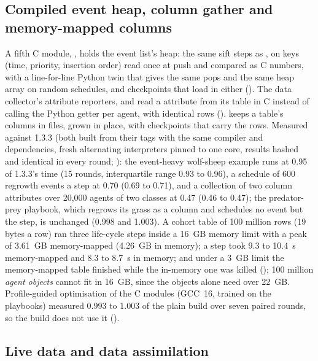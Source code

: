 \subsection{Compiled event heap, column gather and memory-mapped columns}
\label{app:perf2}

A fifth C module, , holds the event list's heap: the same sift steps as
, on keys (time, priority, insertion order) read once at push and compared as C
numbers, with a line-for-line Python twin that gives the same pops and the same heap array on
random schedules, and checkpoints that load in either ().
The data collector's attribute reporters,  and  read a
 attribute from its table in C instead of calling the Python getter per agent,
with identical rows ().  keeps a
table's columns in  files, grown in place, with checkpoints that carry the
rows. Measured against 1.3.3 (both built from their tags with the same compiler and
dependencies, fresh alternating interpreters pinned to one core, results hashed and identical
in every round; ): the event-heavy wolf-sheep example runs at 0.95
of 1.3.3's time (15 rounds, interquartile range 0.93 to 0.96), a schedule of 600 regrowth
events a step at 0.70 (0.69 to 0.71), and a collection of two column attributes over 20,000
agents of two classes at 0.47 (0.46 to 0.47); the predator-prey playbook, which regrows its
grass as a column and schedules no event but the step, is unchanged (0.998 and 1.003). A
cohort table of 100 million rows (19 bytes a row) ran three life-cycle steps inside a 16~GB
 memory limit with a peak of 3.61~GB memory-mapped (4.26~GB in memory); a step
took 9.3 to 10.4~s memory-mapped and 8.3 to 8.7~s in memory; and under a 3~GB limit the memory-mapped table finished while the in-memory one
was killed (); 100 million \emph{agent objects} cannot fit
in 16~GB, since the objects alone need over 22~GB. Profile-guided optimisation of the C
modules (GCC~16, trained on the playbooks) measured 0.993 to 1.003 of the plain build over
seven paired rounds, so the build does not use it ().

\subsection{Live data and data assimilation}
\label{app:assimilation}

